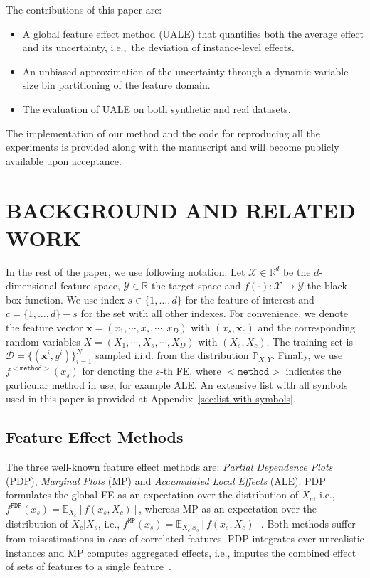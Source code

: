 \documentclass[twoside]{article}
\newcommand{\xc}{\mathbf{x}_c}
\newcommand{\xb}{\mathbf{x}}
\begin{document}
The contributions of this
paper are:
\begin{itemize}
\item A global feature effect method (UALE) that quantifies both the
  average effect and its uncertainty, i.e.,~the deviation of
  instance-level effects.
\item An unbiased approximation of the uncertainty through a dynamic
  variable-size bin partitioning of the feature domain.
\item The evaluation of UALE on both synthetic and real datasets.
\end{itemize}

The implementation of our method and the code for reproducing all the
experiments is provided along with the manuscript and will become
publicly available upon acceptance.

\section{BACKGROUND AND RELATED WORK}

In the rest of the paper, we use following notation. Let \(\mathcal{X} \in \mathbb{R}^d\) be the \(d\)-dimensional feature
space, \(\mathcal{Y} \in \mathbb{R}\) the target space and
\(f(\cdot) : \mathcal{X} \rightarrow \mathcal{Y}\) the black-box
function. We use index \(s \in \{1, \ldots, d\}\) for the feature of
interest and \(c = \{1, \ldots, d\} - s\) for the set with all other
indexes. For convenience, we denote the feature vector
\(\xb = (x_1, \cdots , x_s, \cdots, x_D)\) with \((x_s, \xc)\) and the
corresponding random variables
\(X = (X_1, \cdots , X_s, \cdots, X_D)\) with \((X_s, X_c)\). The
training set is \(\mathcal{D} = \{(\xb^i, y^i)\}_{i=1}^N\) sampled
i.i.d. from the distribution \(\mathbb{P}_{X,Y}\). Finally, we use
\(f^{\mathtt{<method>}}(x_s)\) for denoting the \(s\)-th FE, where
\(\mathtt{<method>}\) indicates the particular method in use, for
example ALE. An extensive list with all symbols used in this paper is
provided at Appendix~\ref{sec:list-with-symbols}.

\subsection{Feature Effect Methods}
\label{sec:feat-effect-meth}
The three well-known feature effect methods are: \emph{Partial
  Dependence Plots} (PDP), \emph{Marginal Plots} (MP) and
\emph{Accumulated Local Effects} (ALE).  PDP formulates the global FE
as an expectation over the distribution of \(X_c\), i.e.,
\(f^{\mathtt{PDP}}(x_s) = \mathbb{E}_{X_c}[f(x_s,X_c)]\), whereas MP
as an expectation over the distribution of \(X_c|X_s\), i.e.,
\(f^{\mathtt{MP}}(x_s) = \mathbb{E}_{X_c|x_s}[f(x_s, X_c)]\). Both
methods suffer from misestimations in case of correlated features. PDP
integrates over unrealistic instances and MP computes aggregated
effects, i.e., imputes the combined effect of sets of features to a
single feature~\citep{apley2020visualizing}.
\end{document}
